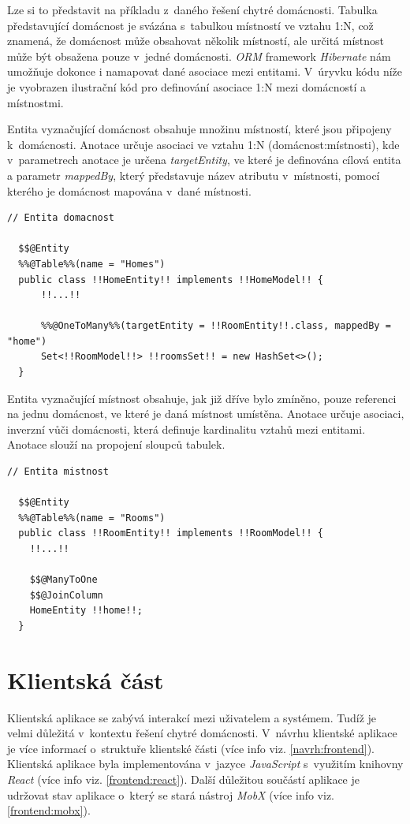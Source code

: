 Lze si to představit na příkladu z~daného řešení chytré domácnosti.
Tabulka představující domácnost je svázána s~tabulkou místností ve vztahu 1:N, což znamená, že domácnost může obsahovat několik místností, ale určitá místnost může být obsažena pouze v~jedné domácnosti.
\emph{ORM} framework \emph{Hibernate} nám umožňuje dokonce i namapovat dané asociace mezi entitami.
V~úryvku kódu níže je vyobrazen ilustrační kód pro definování asociace 1:N mezi domácností a místnostmi.

Entita vyznačující domácnost obsahuje množinu místností, které jsou připojeny k~domácnosti.
Anotace  určuje asociaci ve vztahu 1:N (domácnost:místnosti), kde v~parametrech anotace je určena \emph{targetEntity}, ve které je definována cílová entita a
parametr \emph{mappedBy}, který představuje název atributu v~místnosti, pomocí kterého je domácnost mapována v~dané místnosti.

\begin{lstlisting}[style=JavaStyle, caption={Ukázka asociace 1:N (domácnost:místnosti)}]
  // Entita domacnost
  
  $$@Entity
  %%@Table%%(name = "Homes")
  public class !!HomeEntity!! implements !!HomeModel!! {
      !!...!!

      %%@OneToMany%%(targetEntity = !!RoomEntity!!.class, mappedBy = "home")
      Set<!!RoomModel!!> !!roomsSet!! = new HashSet<>();
  }
\end{lstlisting}

Entita vyznačující místnost obsahuje, jak již dříve bylo zmíněno, pouze referenci na jednu domácnost, ve které je daná místnost umístěna.
Anotace  určuje asociaci, inverzní vůči domácnosti, která definuje kardinalitu vztahů mezi entitami.
Anotace  slouží na propojení sloupců tabulek.

\begin{lstlisting}[style=JavaStyle,caption={Ukázka asociace 1:N (domácnost:místnosti)}]
  // Entita mistnost
  
  $$@Entity
  %%@Table%%(name = "Rooms")
  public class !!RoomEntity!! implements !!RoomModel!! {
    !!...!!

    $$@ManyToOne
    $$@JoinColumn
    HomeEntity !!home!!;
  }
\end{lstlisting}

\newpage
\section{Klientská část}
\label{impl:frontend}
Klientská aplikace se zabývá interakcí mezi uživatelem a systémem.
Tudíž je velmi důležitá v~kontextu řešení chytré domácnosti.
V~návrhu klientské aplikace je více informací o~struktuře klientské části (více info viz. \ref{navrh:frontend}).
Klientská aplikace byla implementována v~jazyce \emph{JavaScript} s~využitím knihovny \emph{React} (více info viz. \ref{frontend:react}).
Další důležitou součástí aplikace je udržovat stav aplikace o~který se stará nástroj \emph{MobX} (více info viz. \ref{frontend:mobx}).

